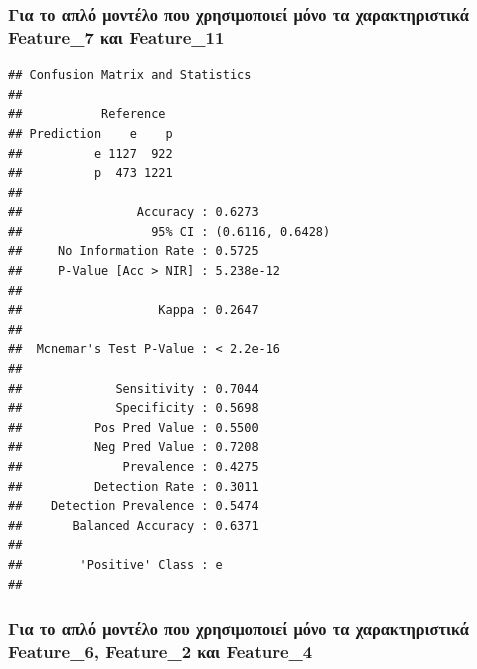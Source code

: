 \documentclass[
]{article}
\newenvironment{Shaded}{\begin{snugshade}}{\end{snugshade}}
\newcommand{\FunctionTok}[1]{\textcolor[rgb]{0.13,0.29,0.53}{\textbf{#1}}}
\newcommand{\NormalTok}[1]{#1}
\newcommand{\SpecialCharTok}[1]{\textcolor[rgb]{0.81,0.36,0.00}{\textbf{#1}}}
\begin{document}
\subsubsection*{Για το απλό μοντέλο που χρησιμοποιεί μόνο τα
χαρακτηριστικά Feature\_7 και
Feature\_11}\label{ux3b3ux3b9ux3b1-ux3c4ux3bf-ux3b1ux3c0ux3bbux3cc-ux3bcux3bfux3bdux3c4ux3adux3bbux3bf-ux3c0ux3bfux3c5-ux3c7ux3c1ux3b7ux3c3ux3b9ux3bcux3bfux3c0ux3bfux3b9ux3b5ux3af-ux3bcux3ccux3bdux3bf-ux3c4ux3b1-ux3c7ux3b1ux3c1ux3b1ux3baux3c4ux3b7ux3c1ux3b9ux3c3ux3c4ux3b9ux3baux3ac-feature_7-ux3baux3b1ux3b9-feature_11}

\begin{Shaded}
\end{Shaded}

\begin{verbatim}
## Confusion Matrix and Statistics
## 
##           Reference
## Prediction    e    p
##          e 1127  922
##          p  473 1221
##                                           
##                Accuracy : 0.6273          
##                  95% CI : (0.6116, 0.6428)
##     No Information Rate : 0.5725          
##     P-Value [Acc > NIR] : 5.238e-12       
##                                           
##                   Kappa : 0.2647          
##                                           
##  Mcnemar's Test P-Value : < 2.2e-16       
##                                           
##             Sensitivity : 0.7044          
##             Specificity : 0.5698          
##          Pos Pred Value : 0.5500          
##          Neg Pred Value : 0.7208          
##              Prevalence : 0.4275          
##          Detection Rate : 0.3011          
##    Detection Prevalence : 0.5474          
##       Balanced Accuracy : 0.6371          
##                                           
##        'Positive' Class : e               
## 
\end{verbatim}

\subsubsection*{Για το απλό μοντέλο που χρησιμοποιεί μόνο τα
χαρακτηριστικά Feature\_6, Feature\_2 και
Feature\_4}\label{ux3b3ux3b9ux3b1-ux3c4ux3bf-ux3b1ux3c0ux3bbux3cc-ux3bcux3bfux3bdux3c4ux3adux3bbux3bf-ux3c0ux3bfux3c5-ux3c7ux3c1ux3b7ux3c3ux3b9ux3bcux3bfux3c0ux3bfux3b9ux3b5ux3af-ux3bcux3ccux3bdux3bf-ux3c4ux3b1-ux3c7ux3b1ux3c1ux3b1ux3baux3c4ux3b7ux3c1ux3b9ux3c3ux3c4ux3b9ux3baux3ac-feature_6-feature_2-ux3baux3b1ux3b9-feature_4}
\end{document}
